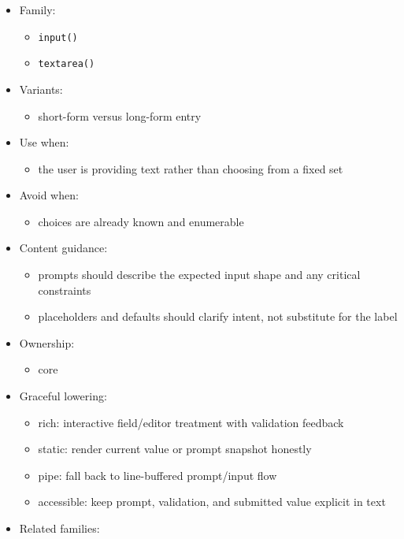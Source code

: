 \begin{itemize}
\tightlist
\item
  Family:

  \begin{itemize}
  \tightlist
  \item
    \texttt{i\allowbreak{}n\allowbreak{}p\allowbreak{}u\allowbreak{}t\allowbreak{}(\allowbreak{})}
  \item
    \texttt{t\allowbreak{}e\allowbreak{}x\allowbreak{}t\allowbreak{}a\allowbreak{}r\allowbreak{}e\allowbreak{}a\allowbreak{}(\allowbreak{})}
  \end{itemize}
\item
  Variants:

  \begin{itemize}
  \tightlist
  \item
    short-form versus long-form entry
  \end{itemize}
\item
  Use when:

  \begin{itemize}
  \tightlist
  \item
    the user is providing text rather than choosing from a fixed set
  \end{itemize}
\item
  Avoid when:

  \begin{itemize}
  \tightlist
  \item
    choices are already known and enumerable
  \end{itemize}
\item
  Content guidance:

  \begin{itemize}
  \tightlist
  \item
    prompts should describe the expected input shape and any critical constraints
  \item
    placeholders and defaults should clarify intent, not substitute for the label
  \end{itemize}
\item
  Ownership:

  \begin{itemize}
  \tightlist
  \item
    core
  \end{itemize}
\item
  Graceful lowering:

  \begin{itemize}
  \tightlist
  \item
    rich: interactive field/editor treatment with validation feedback
  \item
    static: render current value or prompt snapshot honestly
  \item
    pipe: fall back to line-buffered prompt/input flow
  \item
    accessible: keep prompt, validation, and submitted value explicit in text
  \end{itemize}
\item
  Related families:


\end{itemize}
